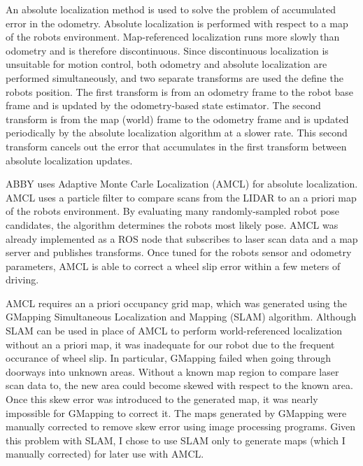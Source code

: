 \documentclass{cwru}
\begin{document}
An absolute localization method is used to solve the problem of accumulated error in the odometry. Absolute localization is performed with respect to a map of the robot{\textquotesingle}s environment. Map-referenced localization runs more slowly than odometry and is therefore discontinuous. Since discontinuous localization is unsuitable for motion control, both odometry and absolute localization are performed simultaneously, and two separate transforms are used the define the robot{\textquotesingle}s position. The first transform is from an odometry frame to the robot base frame and is updated by the odometry-based state estimator. The second transform is from the map (world) frame to the odometry frame and is updated periodically by the absolute localization algorithm at a slower rate. This second transform cancels out the error that accumulates in the first transform between absolute localization updates.

ABBY uses Adaptive Monte Carle Localization (AMCL)\cite{probabilistic-robotics} for absolute localization. AMCL uses a particle filter to compare scans from the LIDAR to an a priori map of the robot{\textquotesingle}s environment. By evaluating many randomly-sampled robot pose candidates, the algorithm determines the robot{\textquotesingle}s most likely pose. AMCL was already implemented as a ROS node that subscribes to laser scan data and a map server and publishes transforms. Once tuned for the robot{\textquotesingle}s sensor and odometry parameters, AMCL is able to correct a wheel slip error within a few meters of driving.

AMCL requires an a priori occupancy grid map\cite{occ-grid}, which was generated using the GMapping Simultaneous Localization and Mapping (SLAM) algorithm.\cite{gmapping} Although SLAM can be used in place of AMCL to perform world-referenced localization without an a priori map, it was inadequate for our robot due to the frequent occurance of wheel slip. In particular, GMapping failed when going through doorways into unknown areas. Without a known map region to compare laser scan data to, the new area could become skewed with respect to the known area. Once this skew error was introduced to the generated map, it was nearly impossible for GMapping to correct it. The maps generated by GMapping were manually corrected to remove skew error using image processing programs. Given this problem with SLAM, I chose to use SLAM only to generate maps (which I manually corrected) for later use with AMCL.
\end{document}

